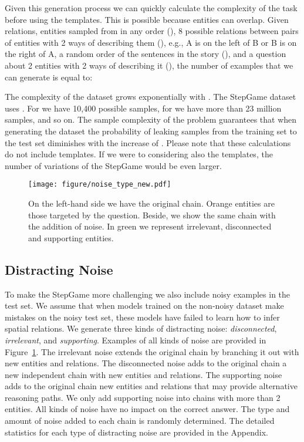 \documentclass[letterpaper]{article} \usepackage{aaai22}  \usepackage{times}  \usepackage{helvet}  \usepackage{courier}  \usepackage[hyphens]{url}  \usepackage{graphicx} \urlstyle{rm} \def\UrlFont{\rm}  \usepackage{natbib}  \usepackage{caption} \DeclareCaptionStyle{ruled}{labelfont=normalfont,labelsep=colon,strut=off} \frenchspacing  \setlength{\pdfpagewidth}{8.5in}  \setlength{\pdfpageheight}{11in}  \usepackage{algorithm}
\begin{document}

Given this generation process we can quickly calculate the complexity of the task before using the templates. This is possible because entities can overlap. 
Given  relations,  entities sampled from  in any order (), 8 possible relations between pairs of entities with 2 ways of describing them (), e.g., A is on the left of B or B is on the right of A, a random order of the  sentences in the story (), and a question about 2 entities with 2 ways of describing it (), 
the number of examples that we can generate is equal to: 

The complexity of the dataset grows exponentially with . The StepGame dataset uses . For  we have 10,400 possible samples, for  we have more than 23 million samples, and so on. The sample complexity of the problem guarantees that when generating the dataset the probability of leaking samples from the training set to the test set diminishes with the increase of . Please note that these calculations do not include templates. If we were to considering also the templates, the number of variations of the StepGame would be even larger.



\begin{figure}[!t]
  \centering
\texttt{[image: figure/noise\_type\_new.pdf]}
  \caption{On the left-hand side we have the original chain. Orange entities are those targeted by the question. Beside, we show the same chain with the addition of noise. In green we represent irrelevant, disconnected and supporting entities.}
  \label{fig:example_noise}
\end{figure}

\subsection{Distracting Noise}
To make the StepGame more challenging we also include noisy examples in the test set.
We assume that when models trained on the non-noisy dataset make mistakes on the noisy test set, these models have failed to learn how to infer spatial relations. 
We generate three kinds of distracting noise: \textit{disconnected}, \textit{irrelevant}, and \textit{supporting}.
Examples of all kinds of noise are provided in Figure~\ref{fig:example_noise}. 
The irrelevant noise extends the original chain by branching it out with new entities and relations. 
The disconnected noise adds to the original chain a new independent chain with new entities and relations.
The supporting noise adds to the original chain new entities and relations that may provide alternative reasoning paths. We only add supporting noise into chains with more than 2 entities.
All kinds of noise have no impact on the correct answer.
The type and amount of noise added to each chain is randomly determined. The detailed statistics for each type of distracting noise are provided in the Appendix. 
\end{document}
